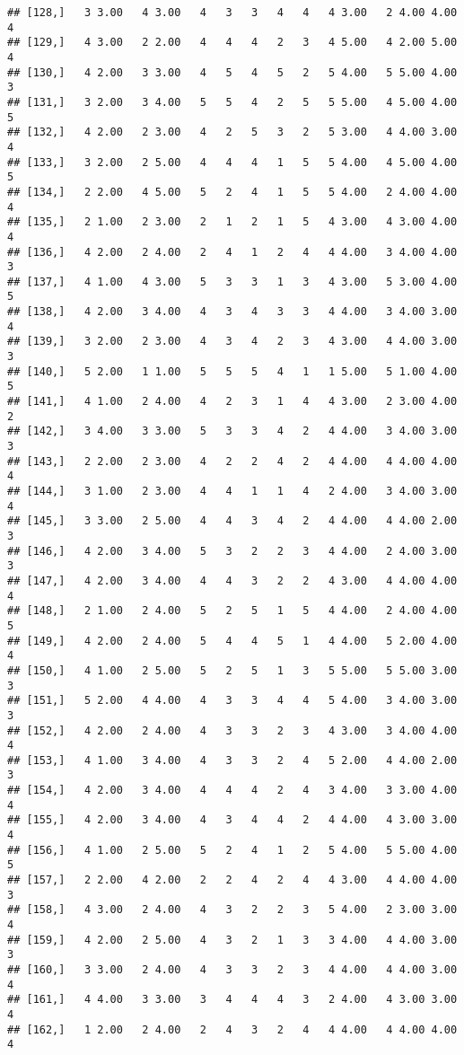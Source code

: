 \documentclass[]{article}
\begin{document}
\begin{verbatim}
## [128,]   3 3.00   4 3.00   4   3   3   4   4   4 3.00   2 4.00 4.00   4
## [129,]   4 3.00   2 2.00   4   4   4   2   3   4 5.00   4 2.00 5.00   4
## [130,]   4 2.00   3 3.00   4   5   4   5   2   5 4.00   5 5.00 4.00   3
## [131,]   3 2.00   3 4.00   5   5   4   2   5   5 5.00   4 5.00 4.00   5
## [132,]   4 2.00   2 3.00   4   2   5   3   2   5 3.00   4 4.00 3.00   4
## [133,]   3 2.00   2 5.00   4   4   4   1   5   5 4.00   4 5.00 4.00   5
## [134,]   2 2.00   4 5.00   5   2   4   1   5   5 4.00   2 4.00 4.00   4
## [135,]   2 1.00   2 3.00   2   1   2   1   5   4 3.00   4 3.00 4.00   4
## [136,]   4 2.00   2 4.00   2   4   1   2   4   4 4.00   3 4.00 4.00   3
## [137,]   4 1.00   4 3.00   5   3   3   1   3   4 3.00   5 3.00 4.00   5
## [138,]   4 2.00   3 4.00   4   3   4   3   3   4 4.00   3 4.00 3.00   4
## [139,]   3 2.00   2 3.00   4   3   4   2   3   4 3.00   4 4.00 3.00   3
## [140,]   5 2.00   1 1.00   5   5   5   4   1   1 5.00   5 1.00 4.00   5
## [141,]   4 1.00   2 4.00   4   2   3   1   4   4 3.00   2 3.00 4.00   2
## [142,]   3 4.00   3 3.00   5   3   3   4   2   4 4.00   3 4.00 3.00   3
## [143,]   2 2.00   2 3.00   4   2   2   4   2   4 4.00   4 4.00 4.00   4
## [144,]   3 1.00   2 3.00   4   4   1   1   4   2 4.00   3 4.00 3.00   4
## [145,]   3 3.00   2 5.00   4   4   3   4   2   4 4.00   4 4.00 2.00   3
## [146,]   4 2.00   3 4.00   5   3   2   2   3   4 4.00   2 4.00 3.00   3
## [147,]   4 2.00   3 4.00   4   4   3   2   2   4 3.00   4 4.00 4.00   4
## [148,]   2 1.00   2 4.00   5   2   5   1   5   4 4.00   2 4.00 4.00   5
## [149,]   4 2.00   2 4.00   5   4   4   5   1   4 4.00   5 2.00 4.00   4
## [150,]   4 1.00   2 5.00   5   2   5   1   3   5 5.00   5 5.00 3.00   3
## [151,]   5 2.00   4 4.00   4   3   3   4   4   5 4.00   3 4.00 3.00   3
## [152,]   4 2.00   2 4.00   4   3   3   2   3   4 3.00   3 4.00 4.00   4
## [153,]   4 1.00   3 4.00   4   3   3   2   4   5 2.00   4 4.00 2.00   3
## [154,]   4 2.00   3 4.00   4   4   4   2   4   3 4.00   3 3.00 4.00   4
## [155,]   4 2.00   3 4.00   4   3   4   4   2   4 4.00   4 3.00 3.00   4
## [156,]   4 1.00   2 5.00   5   2   4   1   2   5 4.00   5 5.00 4.00   5
## [157,]   2 2.00   4 2.00   2   2   4   2   4   4 3.00   4 4.00 4.00   3
## [158,]   4 3.00   2 4.00   4   3   2   2   3   5 4.00   2 3.00 3.00   4
## [159,]   4 2.00   2 5.00   4   3   2   1   3   3 4.00   4 4.00 3.00   3
## [160,]   3 3.00   2 4.00   4   3   3   2   3   4 4.00   4 4.00 3.00   4
## [161,]   4 4.00   3 3.00   3   4   4   4   3   2 4.00   4 3.00 3.00   4
## [162,]   1 2.00   2 4.00   2   4   3   2   4   4 4.00   4 4.00 4.00   4

\end{verbatim}
\end{document}
